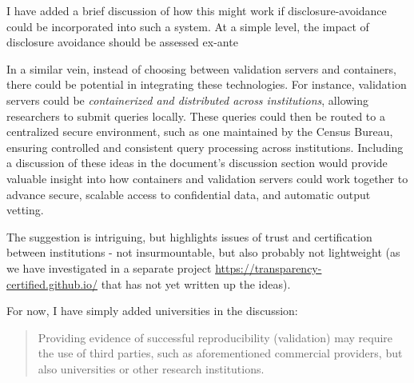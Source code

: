 \begin{response}
    I have added a brief discussion of how this might work if disclosure-avoidance could be incorporated into such a system. At a simple level, the impact of disclosure avoidance should be assessed ex-ante
\end{response}

\begin{referee}


    In a similar vein, instead of choosing between validation servers and containers, there could be potential in integrating these technologies.  For instance, validation servers could be \textit{containerized and distributed across institutions}, allowing researchers to submit queries locally.  These queries could then be routed to a centralized secure environment, such as one maintained by the Census Bureau, ensuring controlled and consistent query processing across institutions.
    Including a discussion of these ideas in the document's discussion section would provide valuable insight into how containers and validation servers could work together to advance secure, scalable access to confidential data, and automatic output vetting.
\end{referee}

\begin{response}
    The suggestion is intriguing, but highlights issues of trust and certification between institutions - not insurmountable, but also probably not lightweight (as we have investigated in a separate project \url{https://transparency-certified.github.io/} that has not yet written up the ideas).

    For now, I have simply added universities in the discussion:

    \begin{quote}
        Providing evidence of successful reproducibility (validation) may require the use of third parties, such as aforementioned commercial providers, but also universities or other research institutions. 
    \end{quote}
\end{response}

